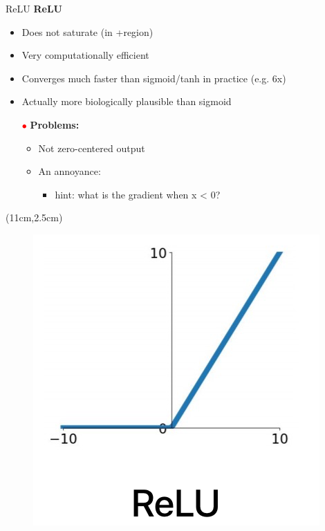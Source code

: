 \documentclass[serif, aspectratio=169]{beamer}
\begin{document}
\begin{frame}{ReLU}
	\textbf{ReLU}
	\begin{itemize}
		\item Does not saturate (in +region)
		\item Very computationally efficient
		\item Converges much faster than sigmoid/tanh \newline in practice (e.g. 6x)
		\item Actually more biologically plausible than sigmoid
		\item[\textcolor{red}{$\bullet$}] \color{red} \textbf{Problems:}
		\begin{itemize}
			\item \color{red} Not zero-centered output
			\item \color{red} An annoyance:
			\begin{itemize}
				\item \color{red} hint: what is the gradient when x < 0?
			\end{itemize}
		\end{itemize}
	\end{itemize}
	\begin{textblock*}{5cm}(11cm,2.5cm) %
		\begin{figure}[htbp]
			\begin{center}
				\includegraphics[keepaspectratio, scale=0.3]{pic/ReLU}
			\end{center}
		\end{figure}
	\end{textblock*}
\end{frame}
\end{document}
